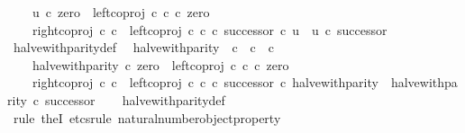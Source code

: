 \begin{isabellebody}
\ \ \ \ u\ {\isasymcirc}\isactrlsub c\ zero\ {\isacharequal}{\kern0pt}\ left{\isacharunderscore}{\kern0pt}coproj\ {\isasymnat}\isactrlsub c\ {\isasymnat}\isactrlsub c\ {\isasymcirc}\isactrlsub c\ zero\ {\isasymand}\isanewline
\ \ \ \ {\isacharparenleft}{\kern0pt}right{\isacharunderscore}{\kern0pt}coproj\ {\isasymnat}\isactrlsub c\ {\isasymnat}\isactrlsub c\ {\isasymamalg}\ {\isacharparenleft}{\kern0pt}left{\isacharunderscore}{\kern0pt}coproj\ {\isasymnat}\isactrlsub c\ {\isasymnat}\isactrlsub c\ {\isasymcirc}\isactrlsub c\ successor{\isacharparenright}{\kern0pt}{\isacharparenright}{\kern0pt}\ {\isasymcirc}\isactrlsub c\ u\ {\isacharequal}{\kern0pt}\ u\ {\isasymcirc}\isactrlsub c\ successor{\isacharparenright}{\kern0pt}{\isachardoublequoteclose}\isanewline
\isanewline
{}\isamarkupfalse%
\ halve{\isacharunderscore}{\kern0pt}with{\isacharunderscore}{\kern0pt}parity{\isacharunderscore}{\kern0pt}def{}{\isacharcolon}{\kern0pt}\isanewline
\ \ {\isachardoublequoteopen}halve{\isacharunderscore}{\kern0pt}with{\isacharunderscore}{\kern0pt}parity\ {\isacharcolon}{\kern0pt}\ {\isasymnat}\isactrlsub c\ {\isasymrightarrow}\ {\isasymnat}\isactrlsub c\ {\isasymCoprod}\ {\isasymnat}\isactrlsub c\ {\isasymand}\ \isanewline
\ \ \ \ halve{\isacharunderscore}{\kern0pt}with{\isacharunderscore}{\kern0pt}parity\ {\isasymcirc}\isactrlsub c\ zero\ {\isacharequal}{\kern0pt}\ left{\isacharunderscore}{\kern0pt}coproj\ {\isasymnat}\isactrlsub c\ {\isasymnat}\isactrlsub c\ {\isasymcirc}\isactrlsub c\ zero\ {\isasymand}\isanewline
\ \ \ \ {\isacharparenleft}{\kern0pt}right{\isacharunderscore}{\kern0pt}coproj\ {\isasymnat}\isactrlsub c\ {\isasymnat}\isactrlsub c\ {\isasymamalg}\ {\isacharparenleft}{\kern0pt}left{\isacharunderscore}{\kern0pt}coproj\ {\isasymnat}\isactrlsub c\ {\isasymnat}\isactrlsub c\ {\isasymcirc}\isactrlsub c\ successor{\isacharparenright}{\kern0pt}{\isacharparenright}{\kern0pt}\ {\isasymcirc}\isactrlsub c\ halve{\isacharunderscore}{\kern0pt}with{\isacharunderscore}{\kern0pt}parity\ {\isacharequal}{\kern0pt}\ halve{\isacharunderscore}{\kern0pt}with{\isacharunderscore}{\kern0pt}parity\ {\isasymcirc}\isactrlsub c\ successor{\isachardoublequoteclose}\isanewline
%
\isadelimproof
\ \ %
\endisadelimproof
%
\isatagproof
{}\isamarkupfalse%
\ halve{\isacharunderscore}{\kern0pt}with{\isacharunderscore}{\kern0pt}parity{\isacharunderscore}{\kern0pt}def\ \isamarkupfalse%
\ {\isacharparenleft}{\kern0pt}rule\ theI{\isacharprime}{\kern0pt}{\isacharcomma}{\kern0pt}\ etcs{\isacharunderscore}{\kern0pt}rule\ natural{\isacharunderscore}{\kern0pt}number{\isacharunderscore}{\kern0pt}object{\isacharunderscore}{\kern0pt}property{}{\isacharparenright}{\kern0pt}%

\end{isabellebody}
